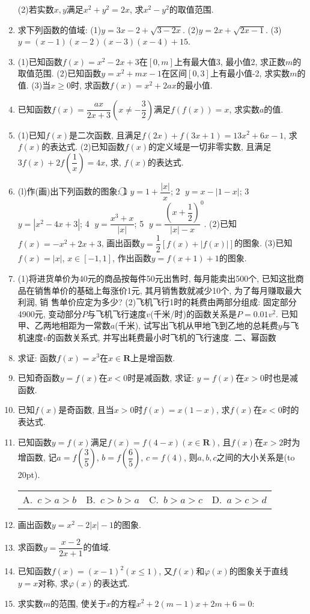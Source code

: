 \documentclass[10pt,a4paper]{article}
\newcommand{\bracket}[1]{(\hbox to #1pt{})}
\newcommand{\fourch}[4]{\par\begin{tabular}{p{.23\textwidth}p{.23\textwidth}p{.23\textwidth}p{.23\textwidth}}
A.~#1 &B.~#2& C.~#3& D.~#4
\end{tabular}}
\begin{document}
\begin{enumerate}[1.]
    (2)若实数$x,y$满足$x^2+y^2=2x$, 求$x^2-y^2$的取值范围.
\item 求下列函数的值域:
(1)$y=3x-2+\sqrt {3-2x}$.
(2)$y=2x+\sqrt {2x-1}$.
(3)$y=(x-1)(x-2)(x-3)(x-4)+15$.
\item (1)已知函数$f(x)=x^2-2x+3$在$[ 0,m ]$上有最大值3, 最小值2, 求正数$m$的取值范围.
    (2)已知函数$y=x^2+mx-1$在区间$[ 0,3 ]$上有最小值-2, 求实数$m$的值.
    (3)当$x\ge 0$时, 求函数$f(x)=x^2+2ax$的最小值.
\item 已知函数$f(x)=\dfrac{ax}{2x+3}(x\ne -\dfrac 32)$满足$f(f(x))=x$, 求实数$a$的值.
\item (1)已知$f(x)$是二次函数, 且满足$f(2x)+f(3x+1)=13x^2+6x-1$, 求$f(x)$的表达式.
    (2)已知函数$f(x)$的定义域是一切非零实数, 且满足$3f(x)+2f(\dfrac 1x)=4x$, 求, $f(x)$的表达式.
\item (l)作(画)出下列函数的图象:
\textcircled{1} $y=1+\dfrac{|x|}x$; \textcircled{2} $y=x-|1-x|$; \textcircled{3} $y=|x^2-4x+3|$; \textcircled{4} $y=\dfrac{x^3+x}{|x|}$; \textcircled{5} $y=\dfrac{(x+\dfrac 12)}{|x|-x}^0$.
(2)已知$f(x)=-x^2+2x+3$, 画出函数$y=\dfrac 12[ f(x)+|f(x)|]$的图象.
(3)已知$f(x)=|x|$, $x\in [ -1,1 ]$, 作出函数$y=f(x+1)+1$的图象.
\item (1)将进货单价为40元的商品按每件50元出售时, 每月能卖出500个, 已知这批商品在销售单价的基础上每涨价1元, 其月销售数就减少10个, 为了每月赚取最大利润, 销
售单价应定为多少?
(2)飞机飞行1时的耗费由两部分组成: 固定部分4900元, 变动部分$P$与飞机飞行速度$v$(千米/时)的函数关系是$P=0.01v^2$. 已知甲、乙两地相距为一常数$a$(千米), 试写出飞机从甲地飞到乙地的总耗费$y$与飞机速度$v$的函数关系式, 并写出耗费最小时飞机的飞行速度.
二、幂函数
\item 求证: 函数$f(x)=x^3$在$x\in \mathbf{R}$上是增函数.
\item 已知奇函数$y=f(x)$在$x<0$时是减函数, 求证: $y=f(x)$在$x>0$时也是减函数.
\item 已知$f(x)$是奇函数, 且当$x>0$时$f(x)=x(1-x)$, 求$f(x)$在$x<0$时的表达式.
\item 已知函数$y=f(x)$满足$f(x)=f(4-x)(x\in \mathbf{R})$, 且$f(x)$在$x>2$时为增函数, 记$a=f(\dfrac 35)$, $b=f(\dfrac 65)$, $c=f(4)$, 则$a,b,c$之间的大小关系是\bracket{20}.
\fourch{$c>a>b$}{$c>b>a$}{$b>a>c$}{$a>c>d$}
\item 画出函数$y=x^2-2|x|-1$的图象.
\item 求函数$y=\dfrac{x-2}{2x+1}$的值域.
\item 已知函数$f(x)=(x-1)^2(x\le 1)$, 又$f(x)$和$\varphi (x)$的图象关于直线$y=x$对称, 求$\varphi (x)$的表达式.
\item 求实数$m$的范围, 使关于$x$的方程$x^2+2(m-1)x+2m+6=0$:

\end{enumerate}
\end{document}

